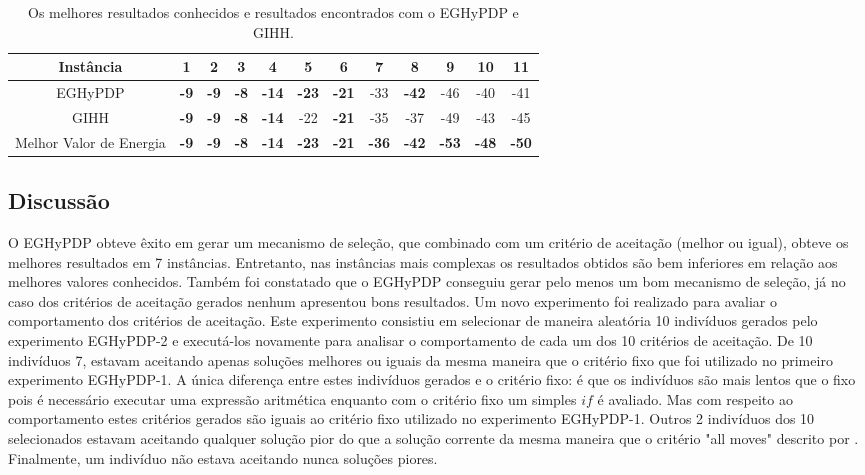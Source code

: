 	\begin{table}[]
		\centering
		\caption{Os melhores resultados conhecidos e resultados encontrados com o EGHyPDP e GIHH.}
		\label{tab:gihhandbhlh}
		\begin{tabular}{cccccccccccc}
			Instância         & 1 & 2 & 3 & 4  & 5  & 6  & 7  & 8  & 9  & 10 & 11 \\ \hline
			EGHyPDP  & \textbf{-9}   & \textbf{-9}    & \textbf{-8}   & \textbf{-14}   & \textbf{-23}   & \textbf{-21}  & -33  & \textbf{-42}   & -46   & -40   & -41   \\ \hline
			GIHH   & \textbf{-9} & \textbf{-9} & \textbf{-8} & \textbf{-14} & -22 & \textbf{-21} & -35 & -37 & -49 & -43 & -45 \\ \hline
			Melhor Valor de Energia   & \textbf{-9} & \textbf{-9} & \textbf{-8} & \textbf{-14} & \textbf{-23} & \textbf{-21} & \textbf{-36} & \textbf{-42} & \textbf{-53} & \textbf{-48} & \textbf{-50}
		\end{tabular}
	\end{table}
	
	
	\subsection{Discussão}
	O EGHyPDP obteve êxito em gerar um mecanismo de seleção, que combinado com um critério de aceitação (melhor ou igual), obteve os melhores resultados em 7 instâncias. Entretanto, nas instâncias mais complexas os resultados obtidos são bem inferiores em relação aos melhores valores conhecidos. Também foi constatado que o EGHyPDP conseguiu gerar pelo menos um bom mecanismo de seleção, já no caso dos critérios de aceitação gerados nenhum apresentou bons resultados. Um novo experimento foi realizado para avaliar o comportamento dos critérios de aceitação. Este experimento consistiu em selecionar de maneira aleatória 10 indivíduos gerados pelo experimento EGHyPDP-2 e executá-los novamente para analisar o comportamento de cada um dos 10 critérios de aceitação.
	De 10 indivíduos 7, estavam  aceitando apenas soluções melhores ou iguais da mesma maneira que o critério fixo que foi utilizado no primeiro experimento EGHyPDP-1. A única diferença entre estes indivíduos gerados e o critério fixo: é que os indivíduos são mais lentos que o fixo pois é necessário executar uma expressão aritmética enquanto com o critério fixo um simples $if$ é avaliado. Mas com respeito ao comportamento estes critérios gerados são iguais ao critério fixo utilizado no experimento EGHyPDP-1. Outros 2 indivíduos dos 10 selecionados estavam aceitando qualquer solução pior do que a solução corrente da mesma maneira que o critério "all moves" descrito por \cite{burke2013hyper}. Finalmente, um indivíduo não estava aceitando nunca soluções piores.
	
